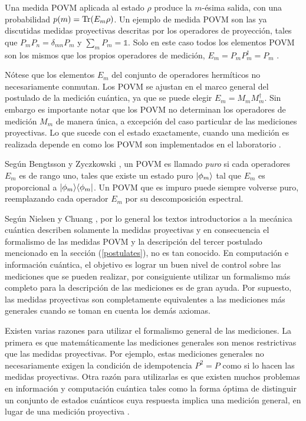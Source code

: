 Una medida POVM aplicada al estado $\rho$ produce la $m$-ésima salida, con una
probabilidad $p(m)={\rm Tr}(E_m \rho)$. Un ejemplo de medida POVM son las ya
discutidas medidas proyectivas descritas por los operadores de proyección,
tales que $P_m P_n=\delta_{mn}P_{m}$ y $\sum_m P_m = \mathds{1}$. Solo en este
caso todos los elementos POVM son los mismos que los propios operadores de
medición, $E_m=P_m P_m^\dagger=P_m$ {\cite{nielsen_chuang_2010}}.


Nótese que los elementos $E_m$ del conjunto de operadores hermíticos no
necesariamente conmutan. Los POVM se ajustan en el marco general del postulado
de la medición cuántica, ya que se puede elegir $E_m=M_m M_m^{\dagger}$. Sin
embargo es importante notar que los POVM no determinan los operadores de
medición $M_m$ de manera única, a excepción del caso particular de las
mediciones proyectivas. Lo que sucede con el estado exactamente, cuando una
medición es realizada depende en como los POVM son implementados en el
laboratorio {\cite{2007geometry}}.   

Según Bengtsson y Zyczkowski {\cite{2007geometry}}, un POVM es llamado
\textit{puro} si cada operadores $E_m$ es de rango uno, tales que existe un
estado puro $|\phi_m\rangle$ tal que $E_m$ es proporcional a $|\phi_m\rangle \langle\phi_m|$.
Un POVM que es impuro puede siempre volverse puro, reemplazando
cada operador $E_m$ por su descomposición espectral. 


Según Nielsen y Chuang {\cite{nielsen_chuang_2010}}, por lo general los textos
introductorios a la mecánica cuántica describen solamente la medidas
proyectivas y en consecuencia el formalismo de las medidas POVM y la
descripción del tercer postulado mencionado en la sección ({\ref{postulates}}),
no es tan conocido. En computación e información cuántica, el objetivo es
lograr un buen nivel de control sobre las mediciones que se pueden realizar,
por consiguiente utilizar un formalismo más completo para la descripción de las
mediciones es de gran ayuda. Por supuesto, las medidas proyectivas son
completamente equivalentes a las mediciones más generales cuando se toman en
cuenta los demás axiomas.


Existen varias razones para utilizar el formalismo general de las mediciones. La primera es que matemáticamente las mediciones generales son menos restrictivas que las medidas proyectivas. Por ejemplo, estas mediciones generales no necesariamente exigen la condición de idempotencia $P^2=P$ como si lo hacen las medidas proyectivas. Otra razón para utilizarlas es que existen muchos problemas en información y computación cuántica tales como la forma óptima de distinguir un conjunto de estados cuánticos cuya respuesta implica una medición general, en lugar de una medición proyectiva {\cite{nielsen_chuang_2010}}.


